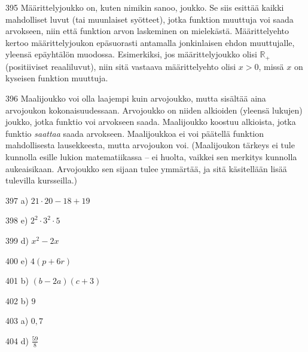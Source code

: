 \begin{Vastaus}{395}
Määrittelyjoukko on, kuten nimikin sanoo, joukko. Se siis esittää kaikki mahdolliset luvut (tai muunlaiset syötteet), jotka funktion muuttuja voi saada arvokseen, niin että funktion arvon laskeminen on mielekästä. Määrittelyehto kertoo määrittelyjoukon epäsuorasti antamalla jonkinlaisen ehdon muuttujalle, yleensä epäyhtälön muodossa. Esimerkiksi, jos määrittelyjoukko olisi $\mathbb{R}_+$ (positiiviset reaaliluvut), niin sitä vastaava määrittelyehto olisi $x>0$, missä $x$ on kyseisen funktion muuttuja.
\end{Vastaus}
\begin{Vastaus}{396}
Maalijoukko voi olla laajempi kuin arvojoukko, mutta sisältää aina arvojoukon kokonaisuudessaan. Arvojoukko on niiden alkioiden (yleensä lukujen) joukko, jotka funktio voi arvokseen saada. Maalijoukko koostuu alkioista, jotka funktio \textit{saattaa} saada arvokseen. Maalijoukkoa ei voi päätellä funktion mahdollisesta lausekkeesta, mutta arvojoukon voi. (Maalijoukon tärkeys ei tule kunnolla esille lukion matematiikassa -- ei huolta, vaikkei sen merkitys kunnolla aukeaisikaan. Arvojoukko sen sijaan tulee ymmärtää, ja sitä käsitellään lisää tulevilla kursseilla.)
	
\end{Vastaus}
\begin{Vastaus}{397}
	 a) $21\cdot 20-18+19$
	
\end{Vastaus}
\begin{Vastaus}{398}
	 e) $2^2\cdot3^2\cdot5$
	
\end{Vastaus}
\begin{Vastaus}{399}
	d) $x^2-2x$
    
\end{Vastaus}
\begin{Vastaus}{400}
	e) $4(p+6r)$
    
\end{Vastaus}
\begin{Vastaus}{401}
	b) $(b-2a)(c+3)$
    
\end{Vastaus}
\begin{Vastaus}{402}
	 b) $9$
    
\end{Vastaus}
\begin{Vastaus}{403}
	 a) $0,7$
    
\end{Vastaus}
\begin{Vastaus}{404}
	 d) $\frac{59}{8}$
    
\end{Vastaus}
